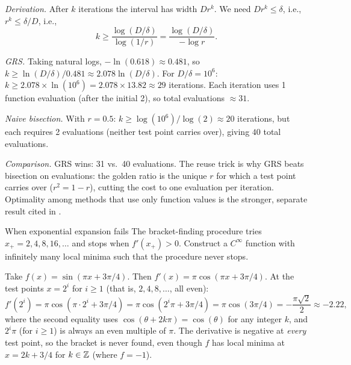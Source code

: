 \solution
\textit{Derivation.}
After $k$ iterations the interval has width $D r^k$.
We need $D r^k \leq \delta$, i.e., $r^k \leq \delta/D$, i.e.,
\begin{equation}\label{eq:ex-grs-count}
	k \geq \frac{\log(D/\delta)}{\log(1/r)} = \frac{\log(D/\delta)}{-\log r}.
\end{equation}

\textit{GRS.}
Taking natural logs, $-\ln(0.618) \approx 0.481$, so $k \geq \ln(D/\delta) / 0.481 \approx 2.078 \ln(D/\delta)$.
For $D/\delta = 10^6$: $k \geq 2.078 \times \ln(10^6) = 2.078 \times 13.82 \approx 29$ iterations.
Each iteration uses 1 function evaluation (after the initial 2), so total evaluations $\approx 31$.

\textit{Naive bisection.}
With $r = 0.5$: $k \geq \log(10^6)/\log(2) \approx 20$ iterations, but each requires 2 evaluations (neither test point carries over), giving $40$ total evaluations.

\textit{Comparison.}
GRS wins: 31 vs.\ 40 evaluations. The reuse trick is why GRS beats bisection on evaluations: the golden ratio is the unique $r$ for which a test point carries over ($r^2 = 1 - r$), cutting the cost to one evaluation per iteration. Optimality among methods that use only function values is the stronger, separate result cited in .

\begin{exercise}{When exponential expansion fails}\label{ex:ds-counterexample}
	The bracket-finding procedure tries $x_+ = 2, 4, 8, 16, \dots$ and stops when $f'(x_+) > 0$.
	Construct a $C^\infty$ function with infinitely many local minima such that the procedure never stops.
\end{exercise}

\solution
Take $f(x) = \sin(\pi x + 3\pi/4)$.
Then $f'(x) = \pi\cos(\pi x + 3\pi/4)$.
At the test points $x = 2^i$ for $i \geq 1$ (that is, $2, 4, 8, \dots$, all even):
\begin{equation}\label{eq:ex-sin-deriv}
	f'(2^i) = \pi\cos(\pi \cdot 2^i + 3\pi/4) = \pi\cos(2^i\pi + 3\pi/4) = \pi\cos(3\pi/4) = -\frac{\pi\sqrt{2}}{2} \approx -2.22,
\end{equation}
where the second equality uses $\cos(\theta + 2k\pi) = \cos(\theta)$ for any integer $k$, and $2^i\pi$ (for $i \geq 1$) is always an even multiple of $\pi$.
The derivative is negative at \emph{every} test point, so the bracket is never found, even though $f$ has local minima at $x = 2k + 3/4$ for $k \in \mathbb{Z}$ (where $f = -1$).

